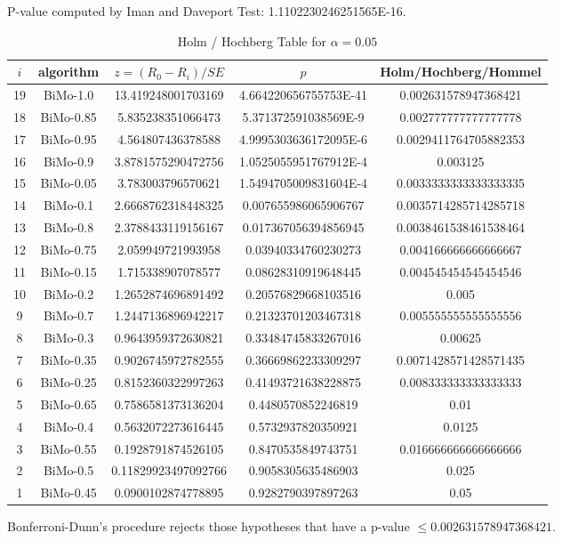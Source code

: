\documentclass[a4paper,10pt]{article}
\begin{document}
\begin{landscape}
P-value computed by Iman and Daveport Test: 1.1102230246251565E-16.\newline

\begin{table}[!htp]
\centering\tiny
\caption{Holm / Hochberg Table for $\alpha=0.05$}
\begin{tabular}{ccccc}
$i$&algorithm&$z=(R_0 - R_i)/SE$&$p$&Holm/Hochberg/Hommel\\
\hline
19&BiMo-1.0&13.419248001703169&4.664220656755753E-41&0.002631578947368421\\
18&BiMo-0.85&5.835238351066473&5.371372591038569E-9&0.002777777777777778\\
17&BiMo-0.95&4.564807436378588&4.9995303636172095E-6&0.0029411764705882353\\
16&BiMo-0.9&3.8781575290472756&1.0525055951767912E-4&0.003125\\
15&BiMo-0.05&3.783003796570621&1.5494705009831604E-4&0.0033333333333333335\\
14&BiMo-0.1&2.6668762318448325&0.007655986065906767&0.0035714285714285718\\
13&BiMo-0.8&2.3788433119156167&0.017367056394856945&0.0038461538461538464\\
12&BiMo-0.75&2.059949721993958&0.03940334760230273&0.004166666666666667\\
11&BiMo-0.15&1.715338907078577&0.08628310919648445&0.004545454545454546\\
10&BiMo-0.2&1.2652874696891492&0.20576829668103516&0.005\\
9&BiMo-0.7&1.2447136896942217&0.21323701203467318&0.005555555555555556\\
8&BiMo-0.3&0.9643959372630821&0.33484745833267016&0.00625\\
7&BiMo-0.35&0.9026745972782555&0.36669862233309297&0.0071428571428571435\\
6&BiMo-0.25&0.8152360322997263&0.41493721638228875&0.008333333333333333\\
5&BiMo-0.65&0.7586581373136204&0.4480570852246819&0.01\\
4&BiMo-0.4&0.5632072273616445&0.5732937820350921&0.0125\\
3&BiMo-0.55&0.1928791874526105&0.8470535849743751&0.016666666666666666\\
2&BiMo-0.5&0.11829923497092766&0.9058305635486903&0.025\\
1&BiMo-0.45&0.0900102874778895&0.9282790397897263&0.05\\
\hline
\end{tabular}
\end{table}
Bonferroni-Dunn's procedure rejects those hypotheses that have a p-value $\le0.002631578947368421$.



\end{landscape}
\end{document}
